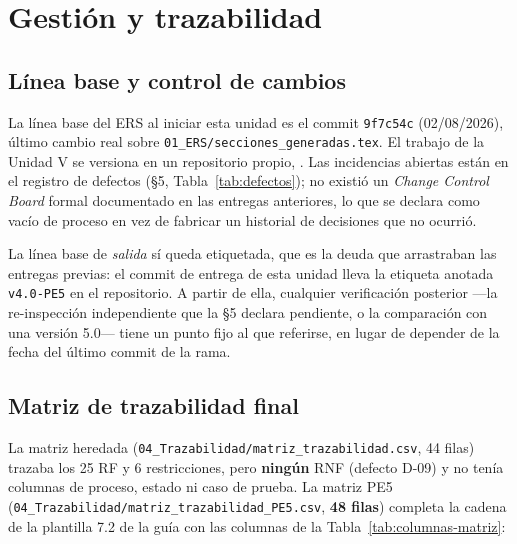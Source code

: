 \section{Gesti\'on y trazabilidad}

\subsection{L\'inea base y control de cambios}

La l\'inea base del ERS al iniciar esta unidad es el commit \texttt{9f7c54c} (02/08/2026), \'ultimo cambio real sobre \texttt{01\_ERS/secciones\_generadas.tex}. El trabajo de la Unidad V se versiona en un repositorio propio, \repourl. Las incidencias abiertas est\'an en el registro de defectos (\S5, Tabla~\ref{tab:defectos}); no existi\'o un \emph{Change Control Board} formal documentado en las entregas anteriores, lo que se declara como vac\'io de proceso en vez de fabricar un historial de decisiones que no ocurri\'o.

La l\'inea base de \emph{salida} s\'i queda etiquetada, que es la deuda que arrastraban las entregas previas: el commit de entrega de esta unidad lleva la etiqueta anotada \texttt{v4.0-PE5} en el repositorio. A partir de ella, cualquier verificaci\'on posterior —la re-inspecci\'on independiente que la \S5 declara pendiente, o la comparaci\'on con una versi\'on 5.0— tiene un punto fijo al que referirse, en lugar de depender de la fecha del \'ultimo commit de la rama.

\subsection{Matriz de trazabilidad final}

La matriz heredada (\texttt{04\_Trazabilidad/matriz\_trazabilidad.csv}, 44 filas) trazaba los 25 RF y 6 restricciones, pero \textbf{ning\'un} RNF (defecto D-09) y no ten\'ia columnas de proceso, estado ni caso de prueba. La matriz PE5 (\texttt{04\_Trazabilidad/matriz\_trazabilidad\_PE5.csv}, \textbf{48 filas}) completa la cadena de la plantilla 7.2 de la gu\'ia con las columnas de la Tabla~\ref{tab:columnas-matriz}:

